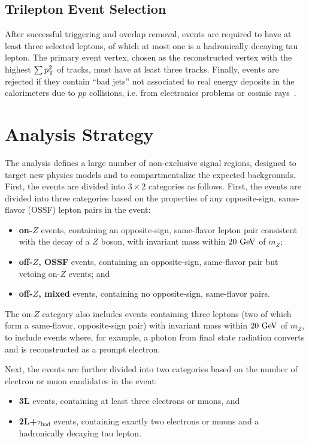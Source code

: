 \subsection{Trilepton Event Selection}\label{sec:model-independent-trilepton-event-selection}
After successful triggering and overlap removal, events are required to have at least three selected leptons, of which at most one is a hadronically decaying tau lepton. The primary event vertex, chosen as the reconstructed vertex with the highest $\sum p_{\text{T}}^2$ of tracks, must have at least three tracks. Finally, events are rejected if they contain ``bad jets'' not associated to real energy deposits in the calorimeters due to $pp$ collisions, i.e. from electronics problems or cosmic rays~\cite{jet-cleaning}.


\section{Analysis Strategy}\label{sec:model-independent-analysis-strategy}
The analysis defines a large number of non-exclusive signal regions, designed to target new physics models and to compartmentalize the expected backgrounds. First, the events are divided into $3\times 2$ categories as follows. First, the events are divided into three categories based on the properties of any opposite-sign, same-flavor (OSSF) lepton pairs in the event:

\begin{itemize}
	\item \textbf{on-$Z$} events, containing an opposite-sign, same-flavor lepton pair consistent with the decay of a $Z$ boson, with invariant mass within $20 \GeV$ of $m_Z$;
	\item \textbf{off-$Z$, OSSF} events, containing an opposite-sign, same-flavor pair but vetoing on-$Z$ events; and
	\item \textbf{off-$Z$, mixed} events, containing no opposite-sign, same-flavor pairs.
\end{itemize}

The on-$Z$ category also includes events containing three leptons (two of which form a same-flavor, opposite-sign pair) with invariant mass within $20 \GeV$ of $m_Z$, to include events where, for example, a photon from final state radiation converts and is reconstructed as a prompt electron.

Next, the events are further divided into two categories based on the number of electron or muon candidates in the event:

\begin{itemize}
	\item \textbf{3L} events, containing at least three electrons or muons, and
	\item \textbf{2L+$\tau_{\mathrm{had}}$} events, containing exactly two electrons or muons and a hadronically decaying tau lepton.
\end{itemize}

